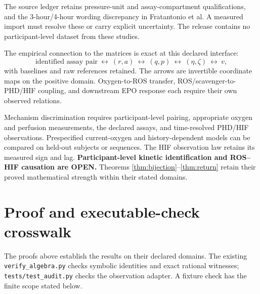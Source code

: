 \documentclass[11pt]{article}
\newcommand{\code}[1]{\nolinkurl{#1}}
\newcommand{\OPEN}{\textup{OPEN}}
\begin{document}
The source ledger retains pressure-unit and assay-compartment qualifications,
and the 3-hour/4-hour wording discrepancy in Fratantonio et al.
A measured import must resolve these or carry explicit uncertainty.
The release contains no participant-level dataset from these studies.

The empirical connection to the matrices is exact at this declared interface:
\[
 \text{identified assay pair}
 \ \longleftrightarrow\ (r,a)
 \ \longleftrightarrow\ (q,p)
 \ \longleftrightarrow\ (\eta,\zeta)
 \ \longleftrightarrow\ v,
\]
with baselines and raw references retained. The arrows are invertible
coordinate maps on the positive domain. Oxygen-to-ROS transfer,
ROS/scavenger-to-PHD/HIF coupling, and downstream EPO response each
require their own observed relations.

Mechanism discrimination requires participant-level pairing, appropriate
oxygen and perfusion measurements, the declared assays, and time-resolved
PHD/HIF observations. Prespecified current-oxygen and history-dependent
models can be compared on held-out subjects or sequences. The HIF
observation law retains its measured sign and lag.
\textbf{Participant-level kinetic identification and ROS--HIF causation
are \OPEN.} Theorems \ref{thm:bijection}--\ref{thm:return} retain
their proved mathematical strength within their stated domains.

\section{Proof and executable-check crosswalk}

The proofs above establish the results on their declared domains.
The existing \code{verify_algebra.py} checks symbolic identities and exact
rational witnesses; \code{tests/test_audit.py} checks the observation adapter.
A fixture check has the finite scope stated below.
\end{document}

